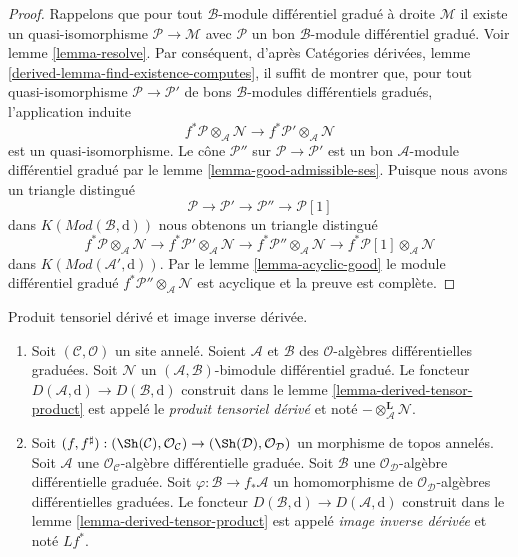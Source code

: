 \begin{proof}
Rappelons que pour tout $\mathcal{B}$-module différentiel gradué à
droite $\mathcal{M}$ il existe un quasi-isomorphisme $\mathcal{P} \to \mathcal{M}$
avec $\mathcal{P}$ un bon $\mathcal{B}$-module différentiel gradué. Voir
lemme \ref{lemma-resolve}. Par
conséquent, d'après Catégories dérivées, lemme \ref{derived-lemma-find-existence-computes},
il suffit de montrer que, pour tout
quasi-isomorphisme $\mathcal{P} \to \mathcal{P}'$ de bons
$\mathcal{B}$-modules différentiels gradués, l'application
induite $$
f^*\mathcal{P} \otimes_\mathcal{A} \mathcal{N}
\longrightarrow
f^*\mathcal{P}' \otimes_\mathcal{A} \mathcal{N}
$$
est un quasi-isomorphisme. Le cône $\mathcal{P}''$
sur $\mathcal{P} \to \mathcal{P}'$ est un bon
$\mathcal{A}$-module différentiel gradué par le lemme \ref{lemma-good-admissible-ses}.
Puisque nous avons un triangle
distingué $$
\mathcal{P} \to \mathcal{P}' \to \mathcal{P}'' \to \mathcal{P}[1]
$$
dans $K(\textit{Mod}(\mathcal{B}, \text{d}))$ nous obtenons un
triangle
distingué $$
f^*\mathcal{P} \otimes_\mathcal{A} \mathcal{N} \to
f^*\mathcal{P}' \otimes_\mathcal{A} \mathcal{N} \to
f^*\mathcal{P}'' \otimes_\mathcal{A} \mathcal{N} \to
f^*\mathcal{P}[1] \otimes_\mathcal{A} \mathcal{N}
$$
dans $K(\textit{Mod}(\mathcal{A}', \text{d}))$. Par
le lemme \ref{lemma-acyclic-good}
le module différentiel gradué
$f^*\mathcal{P}'' \otimes_\mathcal{A} \mathcal{N}$
est acyclique et la preuve est complète.
\end{proof}

\begin{definition}
\label{definition-pullback}
Produit tensoriel dérivé et image inverse dérivée.
\begin{enumerate}
\item Soit $(\mathcal{C}, \mathcal{O})$ un site annelé.
Soient $\mathcal{A}$ et $\mathcal{B}$ des $\mathcal{O}$-algèbres différentielles
graduées. Soit $\mathcal{N}$ un
$(\mathcal{A}, \mathcal{B})$-bimodule différentiel
gradué. Le foncteur $D(\mathcal{A}, \text{d}) \to D(\mathcal{B}, \text{d})$
construit dans le lemme \ref{lemma-derived-tensor-product}
est appelé le {\it produit tensoriel dérivé} et noté
$- \otimes_\mathcal{A}^\mathbf{L} \mathcal{N}$.
\item Soit $(f, f^\sharp) : (\Sh(\mathcal{C}), \mathcal{O}_\mathcal{C})
\to (\Sh(\mathcal{D}), \mathcal{O}_\mathcal{D})$ un
morphisme de topos annelés. Soit $\mathcal{A}$ une
$\mathcal{O}_\mathcal{C}$-algèbre différentielle graduée. Soit $\mathcal{B}$ une
$\mathcal{O}_\mathcal{D}$-algèbre différentielle graduée. Soit
$\varphi : \mathcal{B} \to f_*\mathcal{A}$ un homomorphisme de
$\mathcal{O}_\mathcal{D}$-algèbres différentielles graduées. Le
foncteur $D(\mathcal{B}, \text{d}) \to D(\mathcal{A}, \text{d})$
construit dans le lemme \ref{lemma-derived-tensor-product} est
appelé {\it image inverse dérivée}
et noté $Lf^*$.
\end{enumerate}
\end{definition}

